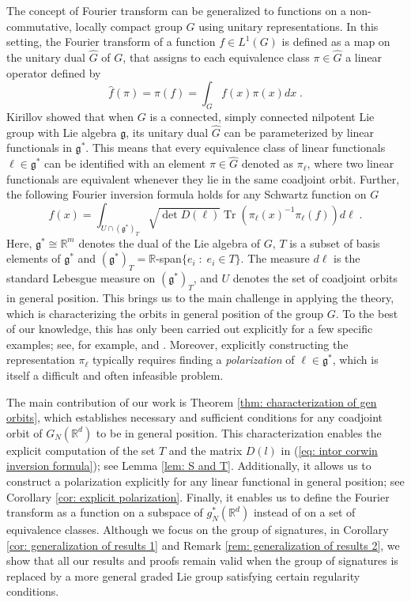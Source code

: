 \documentclass[pdflatex,sn-mathphys-num]{sn-jnl}
\theoremstyle{thmstyletwo}
\theoremstyle{thmstyleone}
\theoremstyle{thmstyletwo}
\newcommand{\fancyg}{\mathfrak{g}}
\newcommand{\R}{\mathbb{R}}
\begin{document}
The concept of Fourier transform can be generalized to functions on a non-commutative, locally compact group $G$ using unitary representations. In this setting, the Fourier transform of a function $f \in L^1(G)$ is defined as a map on the unitary dual $\hat{G}$ of $G$, that assigns to each equivalence class $\pi \in \hat{G}$ a linear operator defined by
\begin{equation*}
    \hat{f}(\pi) = \pi(f) = \int_G f(x)\pi(x)dx \;.
\end{equation*}
Kirillov \cite{kirillov1962unitary} showed that when $G$ is a connected, simply connected nilpotent Lie group with Lie algebra $\fancyg$, its unitary dual $\hat{G}$ can be parameterized by linear functionals in $\fancyg^*$. This means that every equivalence class of linear functionals $\ell \in \fancyg^*$ can be identified with an element $\pi \in \hat{G}$ denoted as $\pi_\ell$, where two linear functionals are equivalent whenever they lie in the same coadjoint orbit. Further, the following Fourier inversion formula holds for any Schwartz function on $G$
	 \cite[Theorem~4.3.9]{corwin1990representations}
	\begin{equation}\label{eq: intor corwin inversion formula}
		f(x) = \int_{U \cap (\fancyg^*)_T}\sqrt{\operatorname{det}D(\ell)}\operatorname{Tr}\left( \pi_\ell(x)^{-1}\pi_\ell(f)\right)d\ell \;.
	\end{equation}
	Here, $\fancyg^* \cong \R^m$ denotes the dual of the Lie algebra of $G$, $T$ is a subset of basis elements of $\fancyg^*$ and $(\fancyg^*)_T = \R$-span$\{e_i \;:\; e_i \in T\}$. The measure $d\ell$ is the standard Lebesgue measure on $(\fancyg^*)_T$, and $U$ denotes the set of coadjoint orbits in general position. This brings us to the main challenge in applying the theory, which is characterizing the orbits in general position of the group $G$. To the best of our knowledge, this has only been carried out explicitly for a few specific examples; see, for example, \cite{corwin1990representations} and \cite{kirillov2004lectures}. Moreover, explicitly constructing the representation $\pi_\ell$ typically requires finding a \textit{polarization} of $\ell \in \fancyg^*$, which is itself a difficult and often infeasible problem.
	
    The main contribution of our work is Theorem \ref{thm: characterization of gen orbits}, which establishes necessary and sufficient conditions for any coadjoint orbit of $G_N(\R^d)$ to be in general position. This characterization enables the explicit computation of the set $T$ and the matrix $D(l)$ in (\ref{eq: intor corwin inversion formula}); see Lemma \ref{lem: S and T}. Additionally, it allows us to construct a polarization explicitly for any linear functional in general position; see Corollary \ref{cor: explicit polarization}. Finally, it enables us to define the Fourier transform as a function on a subspace of $g_N^*(\R^d)$ instead of on a set of equivalence classes. Although we focus on the group of signatures, in Corollary \ref{cor: generalization of results 1} and Remark \ref{rem: generalization of results 2}, we show that all our results and proofs remain valid when the group of signatures is replaced by a more general graded Lie group satisfying certain regularity conditions. 
    
\end{document}
